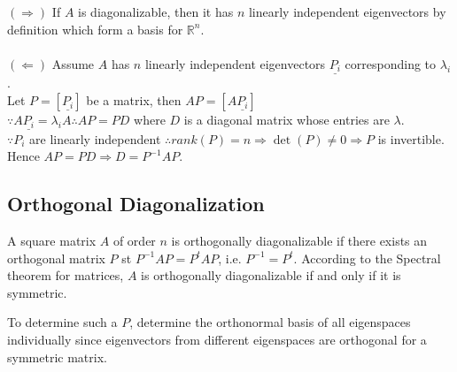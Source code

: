 \documentclass{article}
\begin{document}
\begin{tcolorbox}[colback=lightgray!20, colframe=lightgray!20, fontupper=\linespread{1.3}\selectfont]
	$(\Rightarrow)$ If $A$ is diagonalizable, then it has $n$ linearly independent eigenvectors by definition which form a basis for $\mathbb{R}^n$. \\\\	
	$(\Leftarrow)$ Assume $A$ has $n$ linearly independent eigenvectors $\underline{P_i}$ corresponding to $\lambda_i$. \\
	Let $P = [\underline{P_i}]$ be a matrix, then $AP = [A\underline{P_i}]$ \\
	$\because A\underline{P_i} = \lambda_i A \therefore AP = PD$ where $D$ is a diagonal matrix whose entries are $\lambda$. \\
	$\because P_i$ are linearly independent $\therefore rank(P) = n \Rightarrow \det(P) \not= 0 \Rightarrow P$ is invertible. \\
	Hence $AP = PD \Rightarrow D = P^{-1}AP$.
\end{tcolorbox}

\subsection{Orthogonal Diagonalization}

A square matrix $A$ of order $n$ is orthogonally diagonalizable if there exists an orthogonal matrix $P$ st $P^{-1}AP=P^{t}AP$, i.e. $P^{-1} = P^t$. According to the Spectral theorem for matrices, $A$ is orthogonally diagonalizable if and only if it is symmetric.

To determine such a $P$, determine the orthonormal basis of all eigenspaces individually since eigenvectors from different eigenspaces are orthogonal for a symmetric matrix.
\end{document}
